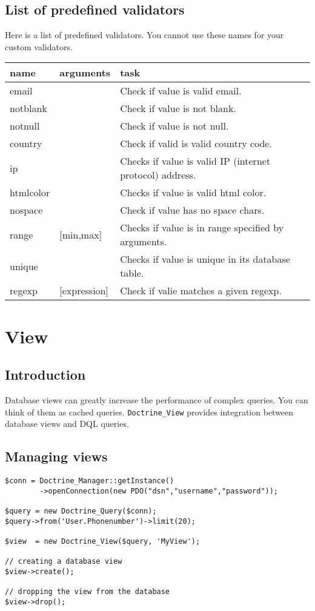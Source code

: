 \documentclass[11pt,a4paper]{report}
\begin{document}
\subsection{List of predefined validators}
Here is a list of predefined validators. You cannot use these names for your custom validators.

\begin{tabular}{|l|l|l|}
\hline
name & arguments & task\\
\hline
email &  & Check if value is valid email.\\
\hline
notblank &  & Check if value is not blank.\\
\hline
notnull &  & Check if value is not null.\\
\hline
country &  & Check if valid is valid country code.\\
\hline
ip &  & Checks if value is valid IP (internet protocol) address.\\
\hline
htmlcolor &  & Checks if value is valid html color.\\
\hline
nospace &  & Check if value has no space chars.\\
\hline
range & [min,max] & Checks if value is in range specified by arguments.\\
\hline
unique &  & Checks if value is unique in its database table.\\
\hline
regexp & [expression] & Check if valie matches a given regexp.\\
\hline
\end{tabular}
\section{View}
\subsection{Introduction}
Database views can greatly increase the performance of complex queries. You can think of them as cached queries. \texttt{Doctrine\_View} provides integration between database views and DQL queries.

\subsection{Managing views}
\begin{verbatim}
$conn = Doctrine_Manager::getInstance()
        ->openConnection(new PDO("dsn","username","password"));

$query = new Doctrine_Query($conn);
$query->from('User.Phonenumber')->limit(20);

$view  = new Doctrine_View($query, 'MyView');

// creating a database view
$view->create();

// dropping the view from the database
$view->drop();
\end{verbatim}
\end{document}

